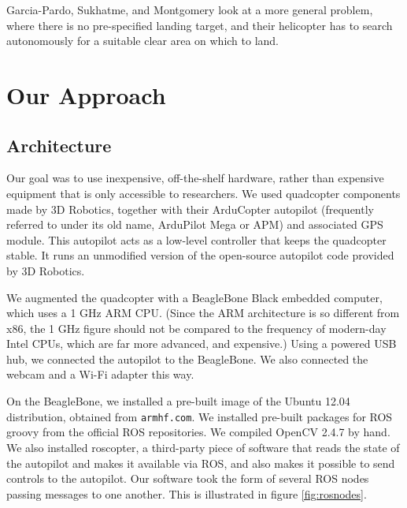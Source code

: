 \documentclass[10pt]{scrartcl} %
\begin{document}
Garcia-Pardo, Sukhatme, and Montgomery \cite{garcia_pardo_et_al_2002} look at a
more general problem, where there is no pre-specified landing target, and their
helicopter has to search autonomously for a suitable clear area on which to
land.


\section{Our Approach}

\subsection{Architecture}

Our goal was to use inexpensive, off-the-shelf hardware, rather than expensive
equipment that is only accessible to researchers. We used quadcopter components
made by 3D Robotics, together with their ArduCopter autopilot (frequently
referred to under its old name, ArduPilot Mega or APM) and associated GPS
module. This autopilot acts as a low-level controller that keeps the quadcopter
stable. It runs an unmodified version of the open-source autopilot code
provided by 3D Robotics.

We augmented the quadcopter with a BeagleBone Black embedded computer, which
uses a 1 GHz ARM CPU. (Since the ARM architecture is so different from x86,
the 1 GHz figure should not be compared to the frequency of modern-day Intel
CPUs, which are far more advanced, and expensive.) Using a powered USB hub, we
connected the autopilot to the BeagleBone. We also connected the webcam and a
Wi-Fi adapter this way.


On the BeagleBone, we installed a pre-built image of the Ubuntu 12.04
distribution, obtained from {\tt armhf.com}. We installed pre-built packages
for ROS groovy from the official ROS repositories. We compiled OpenCV 2.4.7 by
hand. We also installed roscopter, a third-party piece of software that reads
the state of the autopilot and makes it available via ROS, and also makes it
possible to send controls to the autopilot. Our software took the form of
several ROS nodes passing messages to one another. This is illustrated in
figure \ref{fig:rosnodes}.
\end{document}
